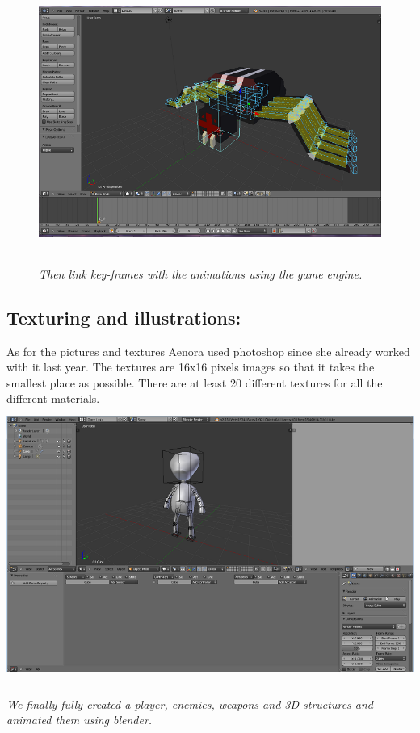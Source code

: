 \documentclass[article]{report} %
\begin{document}
			\begin{figure}[h]
				\includegraphics[width=15cm, height=8.5cm]{Images/Graphics/spider_blend.png}
				\begin{center}\it Then link key-frames with the animations using the game engine. \end{center}
			\end{figure}
\newpage
 \subsection{Texturing and illustrations:}
	As for the pictures and textures Aenora used photoshop since she already worked with it last year. The textures are 16x16 pixels images so that it takes the smallest place as possible. There are at least 20 different textures for all the different materials.\\

				\includegraphics[width=15cm, height=9cm]{images/Graphics/game_engine.png}
				\begin{center}\it We finally fully created a player, enemies, weapons and 3D structures and animated them using blender. 							\end{center}
\end{document}
